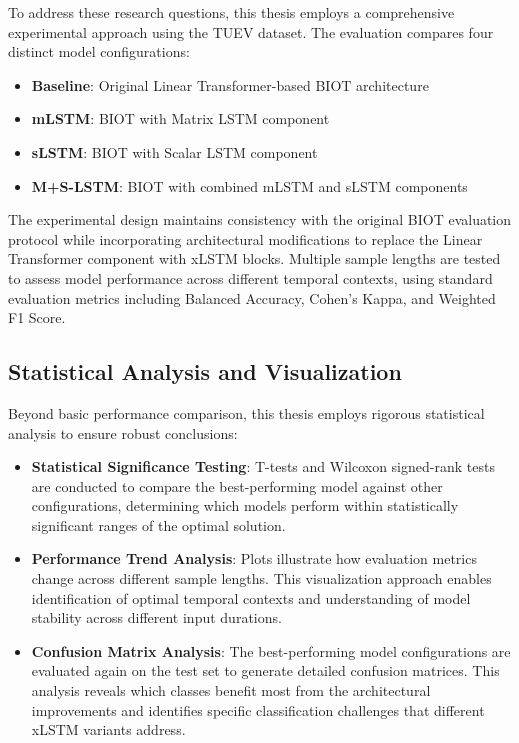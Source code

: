 To address these research questions, this thesis employs a comprehensive experimental approach using the \ac{TUEV} dataset. The evaluation compares four distinct model configurations:

\begin{itemize}
    \item \textbf{Baseline}: Original Linear Transformer-based \ac{BIOT} architecture
    \item \textbf{\ac{mLSTM}}: \ac{BIOT} with Matrix \ac{LSTM} component
    \item \textbf{\ac{sLSTM}}: \ac{BIOT} with Scalar \ac{LSTM} component  
    \item \textbf{M+S-\ac{LSTM}}: \ac{BIOT} with combined \ac{mLSTM} and \ac{sLSTM} components
\end{itemize}

The experimental design maintains consistency with the original \ac{BIOT} evaluation protocol while incorporating architectural modifications to replace the Linear Transformer component with \ac{xLSTM} blocks. Multiple sample lengths are tested to assess model performance across different temporal contexts, using standard evaluation metrics including Balanced Accuracy, Cohen's Kappa, and Weighted F1 Score.

\subsection{Statistical Analysis and Visualization}

Beyond basic performance comparison, this thesis employs rigorous statistical analysis to ensure robust conclusions:

\begin{itemize}
    \item \textbf{Statistical Significance Testing}: T-tests and Wilcoxon signed-rank tests are conducted to compare the best-performing model against other configurations, determining which models perform within statistically significant ranges of the optimal solution.
    
    \item \textbf{Performance Trend Analysis}: Plots illustrate how evaluation metrics change across different sample lengths. This visualization approach enables identification of optimal temporal contexts and understanding of model stability across different input durations.

    \item \textbf{Confusion Matrix Analysis}: The best-performing model configurations are evaluated again on the test set to generate detailed confusion matrices. This analysis reveals which classes benefit most from the architectural improvements and identifies specific classification challenges that different \ac{xLSTM} variants address.
\end{itemize}

